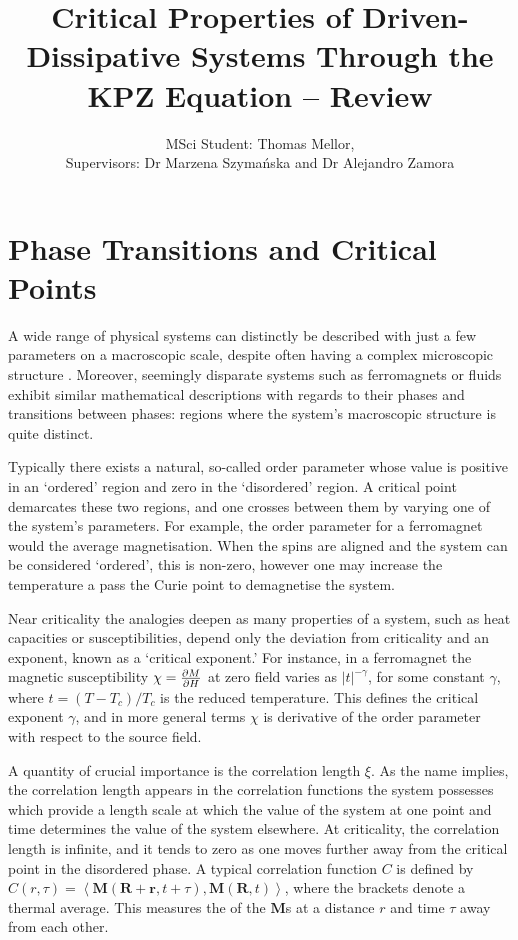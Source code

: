 \documentclass[letterpaper, 10 pt, conference]{IEEEtran}  %
\title{\LARGE \bf
Critical Properties of Driven-Dissipative Systems Through the KPZ Equation -- Review
}
\author{MSci Student: Thomas Mellor,

		Supervisors: Dr Marzena Szyma\'{n}ska and Dr Alejandro Zamora        
}
\newcommand{\mean}[1]{\left < #1 \right >}
\newcommand{\myvec}[1]{\boldsymbol{#1}}
\begin{document}
\maketitle
\thispagestyle{empty}
\pagestyle{empty}




\section{Phase Transitions and Critical Points}

A wide range of physical systems can distinctly be described with just a few parameters on a macroscopic scale, despite often having a complex microscopic structure \cite{binney1992the}. 
Moreover, seemingly disparate systems such as ferromagnets or fluids exhibit similar mathematical descriptions with regards to their phases and transitions between phases: regions where the system's macroscopic structure is quite distinct. 

Typically there exists a natural, so-called order parameter whose value is positive in an `ordered' region and zero in the `disordered' region.
A critical point demarcates these two regions, and one crosses between them by varying one of the system's parameters. 
For example, the order parameter for a ferromagnet would the average magnetisation. When the spins are aligned and the system can be considered `ordered', this is non-zero, however one may increase the temperature a pass the Curie point to demagnetise the system.  

Near criticality the analogies deepen as many properties of a system, such as heat capacities or susceptibilities, depend only the deviation from criticality and an exponent, known as a `critical exponent.'  
For instance, in a ferromagnet the magnetic susceptibility $\chi= \pdv{M}{H}$ at zero field varies as $|t|^{-\gamma}$, for some constant $\gamma$, where $t = (T-T_c)/T_c$ is the reduced temperature. 
This defines the critical exponent $\gamma$, and in more general terms $\chi$ is derivative of the order parameter with respect to the source field. 

A quantity of crucial importance is the correlation length $\xi$. As the name implies, the correlation length appears in the correlation functions the system possesses which provide a length scale at which the value of the system at one point and time determines the value of the system elsewhere. 
At criticality, the correlation length is infinite, and it tends to zero as one moves further away from the critical point in the disordered phase.  
A typical correlation function $C$ is defined by $C(r,\tau) = \mean{\myvec{M}(\myvec{R} + \myvec{r}, t+\tau),\myvec{M}(\myvec{R}, t)}$, where the brackets denote a thermal average. 
This measures the of the $\myvec{M}$s at a distance $r$ and time $\tau$ away from each other. 
\end{document}
